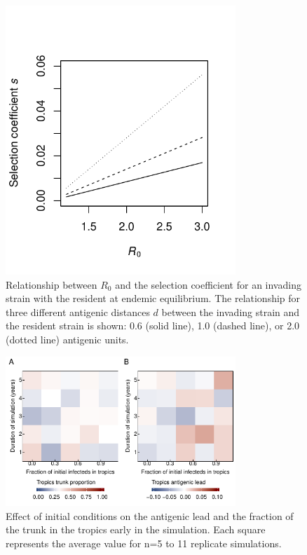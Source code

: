 \documentclass[10pt]{article}
\begin{document}
\newpage
\begin{figure}[h!]
\centerline{\includegraphics[width=3.42in]{./manuscript/figures/R0_selection/R0_selection.pdf}}
\caption{Relationship between $R_0$ and the selection coefficient for an invading strain with the resident at endemic equilibrium. 
The relationship for three different antigenic distances $d$ between the invading strain and the resident strain is shown: 0.6 (solid line), 1.0 (dashed line), or 2.0 (dotted line) antigenic units.}
\label{fig:R0_selection}
\end{figure}

\newpage
\begin{figure}[h!]
\centerline{\includegraphics[width=3.42in]{./manuscript/figures/I0_endYear/I0_endYear.pdf}}
\caption{Effect of initial conditions on the antigenic lead and the fraction of the trunk in the tropics early in the simulation. 
Each square represents the average value for n=5 to 11 replicate simulations.}
\label{fig:I0_endYear}
\end{figure}
\end{document}
